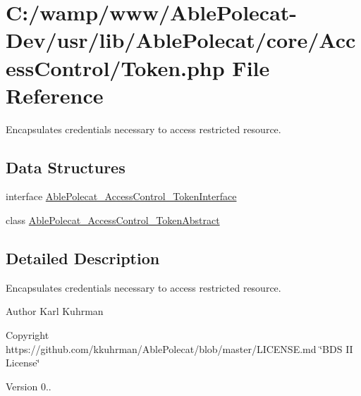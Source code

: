 \hypertarget{_token_8php}{}\section{C\+:/wamp/www/\+Able\+Polecat-\/\+Dev/usr/lib/\+Able\+Polecat/core/\+Access\+Control/\+Token.php File Reference}
\label{_token_8php}


Encapsulates credentials necessary to access restricted resource.  


\subsection*{Data Structures}
\begin{DoxyCompactItemize}
\item 
interface \hyperlink{interface_able_polecat___access_control___token_interface}{Able\+Polecat\+\_\+\+Access\+Control\+\_\+\+Token\+Interface}
\item 
class \hyperlink{class_able_polecat___access_control___token_abstract}{Able\+Polecat\+\_\+\+Access\+Control\+\_\+\+Token\+Abstract}
\end{DoxyCompactItemize}


\subsection{Detailed Description}
Encapsulates credentials necessary to access restricted resource. 

\begin{DoxyAuthor}{Author}
Karl Kuhrman 
\end{DoxyAuthor}
\begin{DoxyCopyright}{Copyright}
https\+://github.com/kkuhrman/\+Able\+Polecat/blob/master/\+L\+I\+C\+E\+N\+S\+E.\+md \char`\"{}\+B\+D\+S I\+I License\char`\"{} 
\end{DoxyCopyright}
\begin{DoxyVersion}{Version}
0.. 
\end{DoxyVersion}
